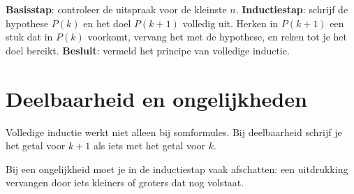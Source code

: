 \begin{werkwijze}
\textbf{Basisstap}: controleer de uitspraak voor de kleinste $n$. \textbf{Inductiestap}: schrijf de hypothese $P(k)$ en het doel $P(k + 1)$ volledig uit. Herken in $P(k + 1)$ een stuk dat in $P(k)$ voorkomt, vervang het met de hypothese, en reken tot je het doel bereikt. \textbf{Besluit}: vermeld het principe van volledige inductie.
\end{werkwijze}


\begin{oefeningen}


\end{oefeningen}

\section{Deelbaarheid en ongelijkheden}

Volledige inductie werkt niet alleen bij somformules. Bij deelbaarheid schrijf je het getal voor $k + 1$ als iets met het getal voor $k$.


\begin{oefeningen}
\end{oefeningen}

Bij een ongelijkheid moet je in de inductiestap vaak afschatten: een uitdrukking vervangen door iets kleiners of groters dat nog volstaat.


